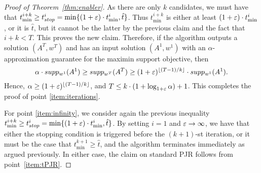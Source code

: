 \begin{proof}[Proof of Theorem~\ref{thm:enabler}]
As there are only $k$ candidates, we must have that 
$t^{i+k}_{\min}\geq t^i_{stop}=\min\{(1+\varepsilon)\cdot t^i_{\min}, \hat{t}\}$. 
Thus $t^{i+k}_{\min}$ is either at least $(1+\varepsilon)\cdot t^i_{\min}$, or it is $\hat{t}$, but it cannot be the latter by the previous claim and the fact that $i+k<T$. This proves the new claim. Therefore, if the algorithm outputs a solution $(A^T,w^T)$ and has an input solution $(A^1, w^1)$ with an $\alpha$-approximation guarantee for the maximin support objective, then 
$$\alpha\cdot supp_{w^1}(A^1) \geq supp_{w^T}(A^T) \geq (1+\varepsilon)^{\lfloor (T-1)/k \rfloor} \cdot supp_{w^1}(A^1).$$
Hence, $\alpha\geq (1+\varepsilon)^{\lfloor (T-1)/k \rfloor}$, and $T\leq k\cdot(1+\log_{1+\varepsilon} \alpha)+1$. This completes the proof of point \ref{item:iterations}.

For point \ref{item:infinity}, we consider again the previous inequality $t^{i+k}_{\min}\geq t^i_{stop}=\min\{(1+\varepsilon)\cdot t^i_{\min}, \hat{t}\}$. By setting $i=1$ and $\varepsilon\rightarrow \infty$, we have that either the stopping condition is triggered before the $(k+1)$-st iteration, or it must be the case that $t^{k+1}_{\min}\geq \hat{t}$, and the algorithm terminates immediately as argued previously. In either case, the claim on standard PJR follows from point~\ref{item:tPJR}.
\end{proof}